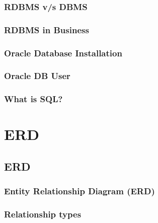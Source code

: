 \documentclass[14pt,fleqn]{extbook} %
\begin{document}
\subsection{RDBMS v/s DBMS}

%
\subsection{RDBMS in Business}

%
\subsection{Oracle Database Installation}

\subsection{Oracle DB User}

\subsection{What is SQL?}



%
\chapter{ERD}
\section{ERD}
\subsection{Entity Relationship Diagram (ERD)}

\subsection{Relationship types}

\end{document}
